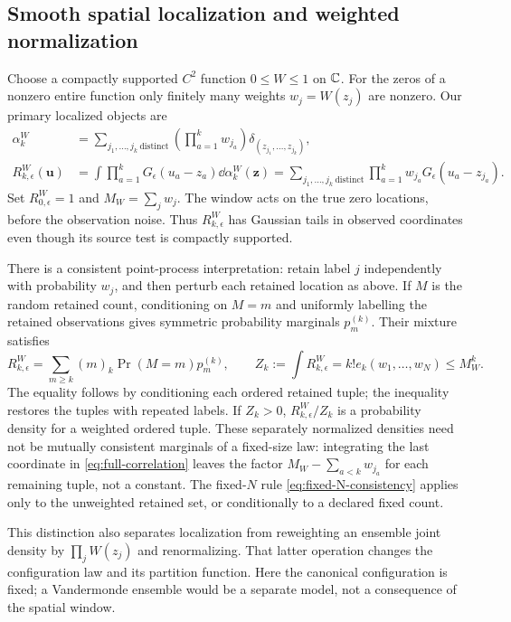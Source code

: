 \subsection{Smooth spatial localization and weighted normalization}

Choose a compactly supported $C^2$ function $0\le W\le1$ on $\mathbb C$.
For the zeros of a nonzero entire function only finitely many weights
$w_j=W(z_j)$ are nonzero. Our primary localized objects are
\begin{align}
 \alpha_k^W&=\sum_{j_1,\ldots,j_k\ \mathrm{distinct}}
       \left(\prod_{a=1}^k w_{j_a}\right)
       \delta_{(z_{j_1},\ldots,z_{j_k})},\label{eq:weighted-factorial}\\
 R_{k,\epsilon}^W(\mathbf u)
   &=\int\prod_{a=1}^kG_\epsilon(u_a-z_a)\dd\alpha_k^W(\mathbf z)
     =\sum_{j_1,\ldots,j_k\ \mathrm{distinct}}
          \prod_{a=1}^k w_{j_a}G_\epsilon(u_a-z_{j_a}).\label{eq:full-correlation}
\end{align}
Set $R_{0,\epsilon}^W=1$ and $M_W=\sum_jw_j$.
The window acts on the true zero locations, before the observation
noise. Thus $R_{k,\epsilon}^W$ has Gaussian tails in observed coordinates
even though its source test is compactly supported.

There is a consistent point-process interpretation: retain label $j$
independently with probability $w_j$, and then perturb each retained
location as above. If $M$ is the random retained count, conditioning on
$M=m$ and uniformly labelling the retained observations gives symmetric
probability marginals $p_m^{(k)}$. Their mixture satisfies
\begin{equation}\label{eq:random-N-consistency}
 R_{k,\epsilon}^W
    =\sum_{m\ge k}(m)_k\Pr(M=m)p_m^{(k)},\qquad
 Z_k:=\int R_{k,\epsilon}^W=k!e_k(w_1,\ldots,w_N)\le M_W^k.
\end{equation}
The equality follows by conditioning each ordered retained tuple;
the inequality restores the tuples with repeated labels. If $Z_k>0$,
$R_{k,\epsilon}^W/Z_k$ is a probability density for a weighted ordered
tuple. These separately normalized densities need not be mutually
consistent marginals of a fixed-size law: integrating the last coordinate
in \eqref{eq:full-correlation} leaves the factor
$M_W-\sum_{a<k}w_{j_a}$ for each remaining tuple, not a constant.
The fixed-$N$ rule \eqref{eq:fixed-N-consistency} applies only to the
unweighted retained set, or conditionally to a declared fixed count.

This distinction also separates localization from reweighting an
ensemble joint density by $\prod_jW(z_j)$ and renormalizing. That latter
operation changes the configuration law and its partition function.
Here the canonical configuration is fixed; a Vandermonde ensemble would
be a separate model, not a consequence of the spatial window.

